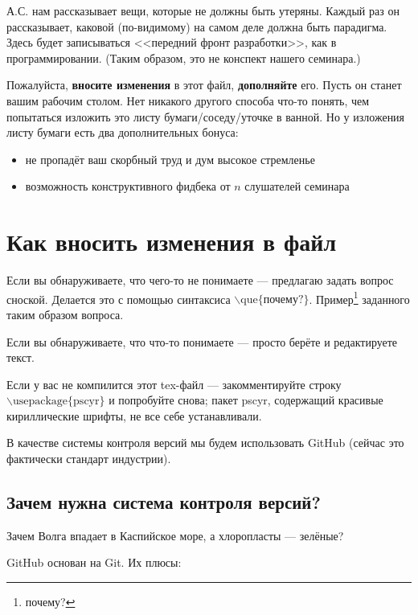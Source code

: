 \documentclass[11pt]{article}
\theoremstyle{remark}
\theoremstyle{definition}
\newcommand{\que}[1]{\footnote{\textcolor[rgb]{0.38,0.69,0.82}{#1}}}
\begin{document}
\baselineskip14pt
\bigskip


\tableofcontents
\bigskip
\bigskip


А.С. нам рассказывает вещи, которые не должны быть утеряны. Каждый раз он рассказывает, каковой (по-видимому) на самом деле должна быть парадигма. Здесь будет записываться <<передний фронт разработки>>, как в программировании. (Таким образом, это не конспект нашего семинара.)

Пожалуйста, \textbf{вносите изменения} в этот файл, \textbf{дополняйте} его. Пусть он станет вашим рабочим столом. Нет никакого другого способа что-то понять, чем попытаться изложить это листу бумаги/соседу/уточке в ванной. Но у изложения листу бумаги есть два дополнительных бонуса:
\begin{itemize}
  \item не пропадёт ваш скорбный труд и дум высокое стремленье
  \item возможность конструктивного фидбека от $n$ слушателей семинара
\end{itemize}

\section{Как вносить изменения в файл}

Если вы обнаруживаете, что чего-то не понимаете --- предлагаю задать вопрос сноской. Делается это с помощью синтаксиса $\backslash \text{que} \{ \text{почему?} \}$. Пример\que{почему?} заданного таким образом вопроса.

Если вы обнаруживаете, что что-то понимаете --- просто берёте и редактируете текст.

Если у вас не компилится этот tex-файл --- закомментируйте строку $\backslash\text{usepackage}\{ \text{pscyr} \}$ и попробуйте снова; пакет pscyr, содержащий красивые кириллические шрифты, не все себе устанавливали.

В качестве системы контроля версий мы будем использовать GitHub (сейчас это фактически стандарт индустрии).

\subsection{Зачем нужна система контроля версий?}

Зачем Волга впадает в Каспийское море, а хлоропласты --- зелёные?

GitHub основан на Git. Их плюсы: 
\end{document}
